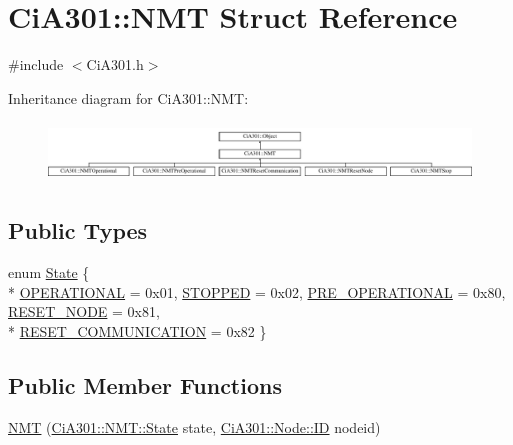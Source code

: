 \hypertarget{struct_ci_a301_1_1_n_m_t}{}\section{Ci\+A301\+:\+:N\+M\+T Struct Reference}
\label{struct_ci_a301_1_1_n_m_t}


{\ttfamily \#include $<$Ci\+A301.\+h$>$}

Inheritance diagram for Ci\+A301\+:\+:N\+M\+T\+:\begin{figure}[H]
\begin{center}
\leavevmode
\includegraphics[height=1.592417cm]{d6/d0d/struct_ci_a301_1_1_n_m_t}
\end{center}
\end{figure}
\subsection*{Public Types}
\begin{DoxyCompactItemize}
\item 
enum \hyperlink{struct_ci_a301_1_1_n_m_t_a08d5e3b45a55a112518bdcc06ff3617a}{State} \{ \\*
\hyperlink{struct_ci_a301_1_1_n_m_t_a08d5e3b45a55a112518bdcc06ff3617aae69a04e5dffdaafb6ee9f4da1f627d72}{O\+P\+E\+R\+A\+T\+I\+O\+N\+A\+L} = 0x01, 
\hyperlink{struct_ci_a301_1_1_n_m_t_a08d5e3b45a55a112518bdcc06ff3617aa52f47aaf4a4da7973192b524f74991cc}{S\+T\+O\+P\+P\+E\+D} = 0x02, 
\hyperlink{struct_ci_a301_1_1_n_m_t_a08d5e3b45a55a112518bdcc06ff3617aa185786922de9fd780160d1ae8dcbffe5}{P\+R\+E\+\_\+\+O\+P\+E\+R\+A\+T\+I\+O\+N\+A\+L} = 0x80, 
\hyperlink{struct_ci_a301_1_1_n_m_t_a08d5e3b45a55a112518bdcc06ff3617aaf270c0a154edf557ca5e86e42aa790b7}{R\+E\+S\+E\+T\+\_\+\+N\+O\+D\+E} = 0x81, 
\\*
\hyperlink{struct_ci_a301_1_1_n_m_t_a08d5e3b45a55a112518bdcc06ff3617aa2b5417931cbee7051e24a74ce32b0133}{R\+E\+S\+E\+T\+\_\+\+C\+O\+M\+M\+U\+N\+I\+C\+A\+T\+I\+O\+N} = 0x82
 \}
\end{DoxyCompactItemize}
\subsection*{Public Member Functions}
\begin{DoxyCompactItemize}
\item 
\hyperlink{struct_ci_a301_1_1_n_m_t_ad1ba4e6e7e11c37da30fd37fd10f6ad8}{N\+M\+T} (\hyperlink{struct_ci_a301_1_1_n_m_t_a08d5e3b45a55a112518bdcc06ff3617a}{Ci\+A301\+::\+N\+M\+T\+::\+State} state, \hyperlink{namespace_ci_a301_1_1_node_a9c2ced538fec9de6165937ed18e8617b}{Ci\+A301\+::\+Node\+::\+I\+D} nodeid)
\end{DoxyCompactItemize}
